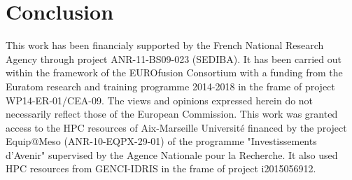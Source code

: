 \documentclass[cpp,a4paper,fleqn,twoside%
]{w-art}
\begin{document}
\section{Conclusion}

\begin{acknowledgement}
This work has been financialy supported by the French National Research
Agency through project ANR-11-BS09-023 (SEDIBA). It has been carried out within
the framework of the EUROfusion Consortium with a funding from the
Euratom research and training programme 2014-2018 in the frame of project
WP14-ER-01/CEA-09. The views and opinions expressed herein do not necessarily
reflect those of the European Commission. This work was granted access to the
HPC resources of Aix-Marseille Universit\'e financed by the project Equip@Meso
(ANR-10-EQPX-29-01) of the programme "Investissements d'Avenir" supervised by
the Agence Nationale pour la Recherche. It also used HPC resources from
GENCI-IDRIS in the frame of project i2015056912.
\end{acknowledgement}


\def\bstname{cpp}

 
 
% 




\end{document}
